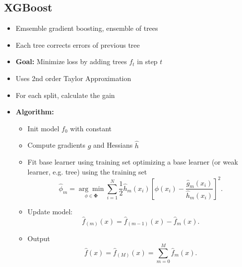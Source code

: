 \documentclass[12pt,a4paper]{article}
\begin{document}
\subsection{XGBoost}
\begin{itemize}
    \item Emsemble gradient boosting, ensemble of trees
    \item Each tree corrects errors of previous tree
    \item \textbf{Goal:} Minimize loss by adding trees $f_t$ in step $t$
    \item Uses 2nd order Taylor Approximation
    \item For each split, calculate the gain
    \item \textbf{Algorithm:} 
    \begin{itemize}
        \item Init model $f_0$ with constant 
        \item Compute gradients $
        \hat g$ and Hessians $\hat h$
        \item Fit base learner using training set optimizing 
        a base learner (or weak learner, e.g. tree) using the training set 
\[{\displaystyle {\hat {\phi }}_{m}={\underset {\phi \in \mathbf {\Phi } }{\arg \min }}\sum _{i=1}^{N}{\frac {1}{2}}{\hat {h}}_{m}(x_{i})\left[\phi (x_{i})-{\frac {{\hat {g}}_{m}(x_{i})}{{\hat {h}}_{m}(x_{i})}}\right]^{2}.}\]
\item Update model:
\[{\displaystyle {\hat {f}}_{(m)}(x)={\hat {f}}_{(m-1)}(x)-{\hat {f}}_{m}(x).}\]
        \item Output 
\[{\displaystyle {\hat {f}}(x)={\hat {f}}_{(M)}(x)=\sum _{m=0}^{M}{\hat {f}}_{m}(x).}\]
    \end{itemize}
\end{itemize}
\end{document}
